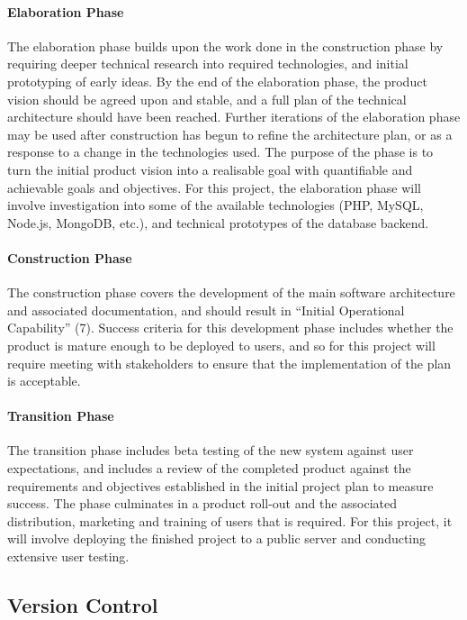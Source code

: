 \paragraph{Elaboration Phase} The elaboration phase builds upon the work done in
the construction phase by requiring deeper technical research into required
technologies, and initial prototyping of early ideas. By the end of the
elaboration phase, the product vision should be agreed upon and stable, and a
full plan of the technical architecture should have been reached.  Further
iterations of the elaboration phase may be used after construction has begun to
refine the architecture plan, or as a response to a change in the technologies
used. The purpose of the phase is to turn the initial product vision into a
realisable goal with quantifiable and achievable goals and objectives. For this
project, the elaboration phase will involve investigation into some of the
available technologies (PHP, MySQL, Node.js, MongoDB, etc.), and technical
prototypes of the database backend.

\paragraph{Construction Phase} The construction phase covers the development of
the main software architecture and associated documentation, and should result
in ``Initial Operational Capability'' (7). Success criteria for this development
phase includes whether the product is mature enough to be deployed to users, and
so for this project will require meeting with stakeholders to ensure that the
implementation of the plan is acceptable.

\paragraph{Transition Phase} The transition phase includes beta testing of the
new system against user expectations, and includes a review of the completed
product against the requirements and objectives established in the initial
project plan to measure success. The phase culminates in a product roll-out and
the associated distribution, marketing and training of users that is
required. For this project, it will involve deploying the finished project to a
public server and conducting extensive user testing.

\subsection{Version Control}

